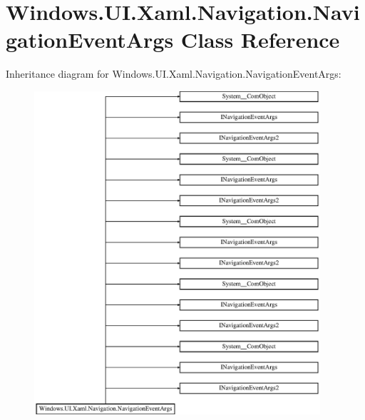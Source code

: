 \hypertarget{class_windows_1_1_u_i_1_1_xaml_1_1_navigation_1_1_navigation_event_args}{}\section{Windows.\+U\+I.\+Xaml.\+Navigation.\+Navigation\+Event\+Args Class Reference}
\label{class_windows_1_1_u_i_1_1_xaml_1_1_navigation_1_1_navigation_event_args}
Inheritance diagram for Windows.\+U\+I.\+Xaml.\+Navigation.\+Navigation\+Event\+Args\+:\begin{figure}[H]
\begin{center}
\leavevmode
\includegraphics[height=12.000000cm]{class_windows_1_1_u_i_1_1_xaml_1_1_navigation_1_1_navigation_event_args}
\end{center}
\end{figure}
